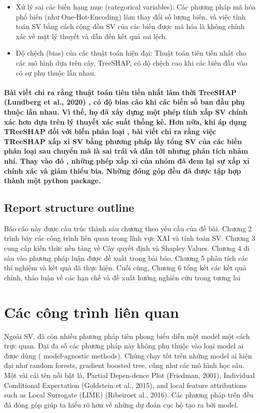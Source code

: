 \documentclass[12pt, a4paper]{article}
\begin{document}
\begin{itemize}
\item{Xử lý sai các biến hạng mục (categorical variables): Các phương pháp mã hóa phổ biến (như One-Hot-Encoding) làm thay đổi số lượng biến, và việc tính toán SV bằng cách cộng dồn SV của các biến được mã hóa là không chính xác về mặt lý thuyết và dẫn đến kết quả sai lệch.}
\item{Độ chệch (bias) của các thuật toán hiện đại: Thuật toán tiên tiến nhất cho các mô hình dựa trên cây, TreeSHAP, có độ chệch cao khi các biến đầu vào có sự phụ thuộc lẫn nhau.
}
\end{itemize}

\paragraph{
Bài viết chỉ ra rằng thuật toán tiên tiến nhất lâm thời TreeSHAP (Lundberg et al., 2020) , có độ bias câo khi các biến số ban đầu phụ thuộc lẫn nhau. Vì thế, họ đã xây dựng một phép tính xấp SV chính xác hơn dựa trên lý thuyết xác suất thống kê. 
Hơn nữa, khi áp dụng TReeSHAP đối với biến phân loại , bài viết chỉ ra rằng việc TReeSHAP xấp xỉ SV bằng phương pháp lấy tổng SV của các biến phân loại sau chuyển mã là sai trái và dẫn tới nhưng phân tích nhảm nhí. Thay vào đó , những phép xấp xỉ của nhóm đã đem lại sự xấp xỉ chính xác và giảm thiểu bia. Những đóng góp đều đã được tập hợp thành một python package.
}

\subsection{Report structure outline}
Báo cáo này được cấu trúc thành sáu chương theo yêu cầu của đề bài. Chương 2 trình bày các công trình liên quan trong lĩnh vực XAI và tính toán SV. Chương 3 cung cấp kiến thức nền tảng về Cây quyết định và Shapley Values. Chương 4 đi sâu vào phương pháp luận được đề xuất trong bài báo. Chương 5 phân tích các thí nghiệm và kết quả đã thực hiện. Cuối cùng, Chương 6 tổng kết các kết quả chính, thảo luận về các hạn chế và đề xuất hướng nghiên cứu trong tương lai
\section{Các công trình liên quan}
Ngoài SV, đã còn nhiều phương pháp tiên phong biểu diễn một model một cách trực quan. Đại đa số các phương pháp này không phụ thuộc vào loại model ai được dùng ( model-agnostic methods). Chúng chạy tốt trên những model ai hiện đại như random forests, gradient boosted tree, cũng như các mô hình học sâu. Một vài cái tên nỗi bật là,   Partial Depen-dence Plot (Friedman, 2001), Individual Conditional Expectation (Goldstein et al., 2015), and local feature attributions such as Local Surrogate (LIME) (Ribeiroet al., 2016). Các phương pháp trên đều đã đóng góp giúp ta hiểu rõ hơn về những dự đoán cục bộ tạo ra bởi model.
\end{document}
